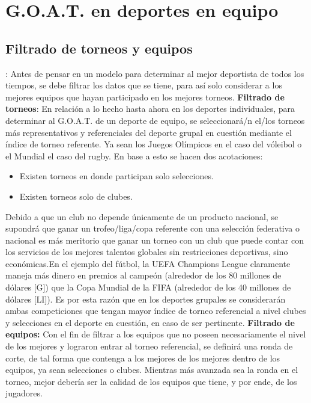 \documentclass[a4paper]{article}
\begin{document}
\section{G.O.A.T. en deportes en equipo}
\subsection{Filtrado de torneos y equipos}:
Antes de pensar en un modelo para determinar al mejor deportista de todos los tiempos, se debe filtrar los datos que se tiene, para así solo considerar a los mejores equipos que hayan participado en los mejores torneos. \newline\newline 
\textbf{Filtrado de torneos}:
En relación a lo hecho hasta ahora en los deportes individuales, para determinar al G.O.A.T. de un deporte de equipo, se seleccionará/n el/los torneos más representativos y referenciales del deporte grupal en cuestión mediante el índice de torneo referente. Ya sean los Juegos Olímpicos en el caso del vóleibol o el Mundial el caso del rugby. En base a esto se hacen dos acotaciones:  
\begin{itemize}
    \item Existen torneos en donde participan solo selecciones.
    \item Existen torneos solo de clubes. 
\end{itemize}
Debido a que un club no depende únicamente de un producto nacional, se supondrá que ganar un trofeo/liga/copa referente con una selección federativa o nacional es más meritorio que ganar un torneo con un club que puede contar con los servicios de los mejores talentos globales sin restricciones deportivas, sino económicas.\newline\newline En el ejemplo del fútbol, la UEFA Champions League claramente maneja más dinero en premios al campeón  (alrededor de los 80 millones de dólares [G]) que la Copa Mundial de la FIFA  (alrededor de los 40 millones de dólares [LI]). \newline\newline Es por esta razón que en los deportes grupales se considerarán ambas competiciones que tengan mayor índice de torneo referencial a nivel clubes y selecciones en el deporte en cuestión, en caso de ser pertinente. \newline\newline \textbf{Filtrado de equipos:} Con el fin de filtrar a los equipos que no poseen necesariamente el nivel de los mejores y lograron entrar al torneo referencial, se definirá una ronda de corte, de tal forma que contenga a los mejores de los mejores dentro de los equipos, ya sean selecciones o clubes. Mientras más avanzada sea la ronda en el torneo, mejor debería ser la calidad de los equipos que tiene, y por ende, de los jugadores.
\end{document}
